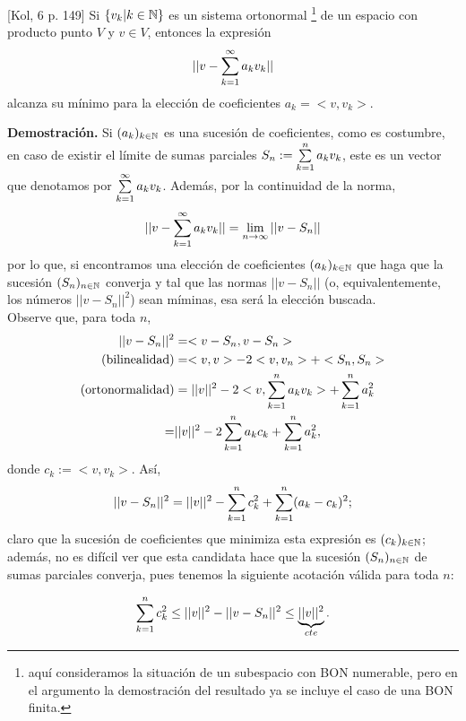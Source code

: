 
\begin{teo} \label{teo: Kol 6, p.149}
[Kol, 6 p. 149] Si $\{ v_{k} |k \in \mathbb{N} \}$ es un sistema
ortonormal \footnote{aquí consideramos la situación de un subespacio
con BON numerable, pero en el argumento la demostración del resultado ya
se incluye el caso de una BON finita.} de un espacio con producto
punto $V$ y $v \in V$, entonces la expresión
\[
|| v - \sum\limits_{k=1}^{\infty}a_{k}v_{k}  ||
\]
alcanza su mínimo para la elección de coeficientes
$a_{k}= <v , v_{k} > $.
\end{teo}

\noindent
\textbf{Demostración.}
Si $(a_{k})_{k \in \mathbb{N}}$ es una sucesión de coeficientes,
como es costumbre,
en caso de existir el límite de sumas parciales
$S_{n}:= \sum\limits_{k=1}^{n}a_{k}v_{k}$, este es un vector que denotamos
por $\sum\limits_{k=1}^{\infty}a_{k}v_{k}$. Además,
por la continuidad de la norma,
\[
||v - \sum\limits_{k=1}^{\infty}a_{k}v_{k} || = \lim\limits_{n \rightarrow \infty }{||v-S_{n}||}
\]
por lo que, si encontramos una elección de coeficientes $(a_{k})_{k \in \mathbb{N}}$
que haga que
la sucesión $(S_{n})_{n \in \mathbb{N}}$ converja y tal que las normas
$||v-S_{n}||$ (o, equivalentemente, los números $||v-S_{n}||^{2}$)
sean míminas, esa será la elección buscada. \\
Observe que, para toda $n$,
\begin{align*}
||v-S_{n}||^{2} & = <v-S_{n} , v-S_{n} > \\
\text{(bilinealidad)} & =  <v, v > - 2 < v , v_{n} > + <S_{n} , S_{n}  > \\
\text{(ortonormalidad)} & =  ||v||^{2} - 2 < v ,\sum\limits_{k=1}^{n}a_{k}v_{k} > + 
\sum\limits_{k=1}^{n}a_{k}^{2} \\
= & ||v||^{2} - 2\sum\limits_{k=1}^{n}a_{k}c_{k}  + 
\sum\limits_{k=1}^{n}a_{k}^{2},
\end{align*}
donde $c_{k}:= < v , v_{k} >$. Así,
\[
||v-S_{n}||^{2} = ||v||^{2} - \sum\limits_{k=1}^{n}c_{k}^{2}  + 
\sum\limits_{k=1}^{n}(a_{k}-c_{k})^{2};
\]
claro que la sucesión de coeficientes que minimiza
esta expresión es $(c_{k})_{k \in \mathbb{N}}$; además, no es difícil ver
que esta candidata hace que la sucesión $(S_{n})_{n \in \mathbb{N}}$
de sumas parciales converja, pues tenemos la siguiente acotación
válida para toda $n$:

\begin{equation} \label{ecuacion teor kolmogorov}
\sum\limits_{k=1}^{n}c_{k}^{2} \leq ||v||^{2}-||v-S_{n}||^{2} \leq 
\underbrace{||v||^{2}}_{cte}.
\end{equation}

